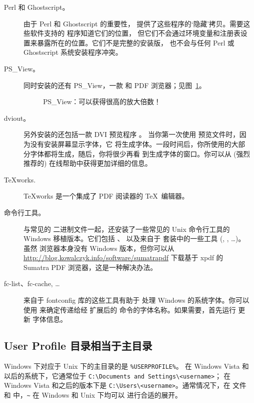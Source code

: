 \documentclass{article}
\begin{document}
\begin{description}
\item[Perl 和 Ghostscript。] 由于 Perl 和  Ghostscript 的重要性，\TL{}
提供了这些程序的`隐藏'拷贝。需要这些软件支持的 \TL{} 程序知道它们的位置，
但它们不会通过环境变量和注册表设置来暴露所在的位置。它们不是完整的安装版，
也不会与任何 Perl 或 Ghostscript 系统安装程序冲突。

\item[PS\_View。] 同时安装的还有 PS\_View，一款 \PS{} 和 PDF
浏览器；见图~\ref{fig:psview}。

\begin{figure}[tb]
\caption{PS\_View：可以获得很高的放大倍数！}\label{fig:psview}
\end{figure}

\item[dviout。] 另外安装的还包括一款 DVI 预览程序 。
当你第一次使用  预览文件时，因为没有安装屏幕显示字体，它
将生成字体。一段时间后，你所使用的大部分字体都将生成，随后，你将很少再看
到生成字体的窗口。你可以从 (强烈推荐的) 在线帮助中获得更加详细的信息。

\item[\TeX{}works.]  \TeX{}works 是一个集成了 PDF 阅读器的
  \TeX\ 编辑器。

\item[命令行工具。] 与常见的 \TL{} 二进制文件一起，还安装了一些常见的
Unix 命令行工具的 Windows 移植版本。它们包括 、
 以及来自于  套装中的一些工具
(, , \ldots)。
虽然  浏览器本身没有 Windows 版本，但你可以从
\url{http://blog.kowalczyk.info/software/sumatrapdf}
下载基于 xpdf 的 Sumatra PDF 浏览器，这是一种解决办法。

\item[fc-list、fc-cache, \ldots] 来自于 fontconfig 库的这些工具有助于 \XeTeX{}
处理 Windows 的系统字体。你可以使用  来确定传递给经 \XeTeX
扩展后的  命令的字体名称。如果需要，首先运行  更新
字体信息。
\end{description}


\subsection{User Profile 目录相当于主目录}
\label{sec:winhome}

Windows 下对应于 Unix 下的主目录的是 \verb|%USERPROFILE%|。
在 Windows Vista 和以后的系统下，它通常位于
\verb|C:\Documents and Settings\<username>|；
在 Windows Vista 和之后的版本下是 \verb|C:\Users\<username>|。通常情况下，在
 文件和 \KPS{} 中，\verb|~| 在 Windows 和 Unix 下均可以
进行合适的展开。
\end{document}

